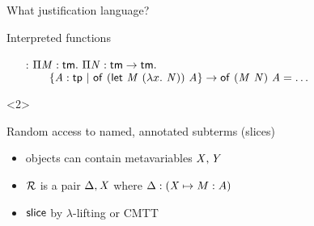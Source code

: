\documentclass{beamer}
\theoremstyle{example}
\begin{document}
\begin{frame}{What justification language?}
\begin{overlayarea}
\begin{onlyenv}
\begin{block}{Interpreted functions}
\begin{examples}
\begin{enumerate}[inline]
          \item[\const{inline} :] $\Pi{\ensuremath{\text{\textit{M}}}}:{\text{\textsf{tm}}}.\  \Pi{\ensuremath{\text{\textit{N}}}}:{\text{\textsf{tm}}\to\text{\textsf{tm}}}.\  $\\ $\qquad \{{\text{\textit{A}}}:{\text{\textsf{tp}}}\ |\ {{\text{\textsf{of}}}\  {(\text{\textsf{let}}\ {\text{\textit{M}}}\ {(\lambda{x}.\  \text{\textit{N}})})}\  {\text{\textit{A}}}}\} \to
            {\ensuremath{\text{\textsf{of}}}}\  {({\text{\textit{M}}}\  {\text{\textit{N}}})}\  {\text{\textit{A}}} =
            \ldots$
          \end{enumerate}
        \end{examples}
      \end{block}
    \end{onlyenv}
    \begin{onlyenv}<2>
      \begin{block}
        {Random access} to named, annotated subterms (slices) \\
        \begin{itemize}
        \item objects can contain metavariables $\text{\textit{X}}, \text{\textit{Y}}$
        \item $\mathcal{R}$ is a pair $\Delta, \text{\textit{X}}$ where $\Delta :
          (\text{\textit{X}}\mapsto M : A)$
        \item ${\rm\mathsf{slice}}$ by $\lambda$-lifting or CMTT
        \end{itemize}
      \end{block}
      \end{onlyenv}
    \end{overlayarea}

\end{frame}
\end{document}
